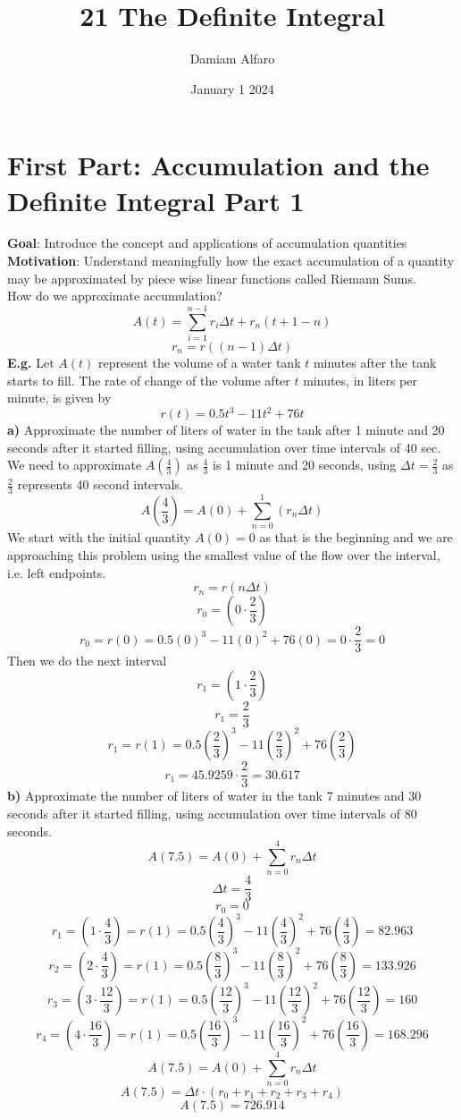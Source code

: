 \documentclass[12pt, letterpaper]{article}
\title{21 The Definite Integral}
\author{Damiam Alfaro}
\date{January 1 2024}
\begin{document}
\maketitle

\section{First Part: Accumulation and the Definite Integral Part 1}
\textbf{Goal}: Introduce the concept and applications of accumulation quantities\\
\newline
\textbf{Motivation}: Understand meaningfully how the exact accumulation of a quantity may be approximated by piece wise linear functions called Riemann Sums.\\
\newline
How do we approximate accumulation?
\[A(t)=\sum_{i=1}^{n-1}r_i\Delta t+r_n(t+1-n)\]
\[r_n = r((n-1)\Delta t)\]
\textbf{E.g.} Let \(A(t)\) represent the volume of a water tank \(t\) minutes after the tank starts to fill. The rate of change of the volume after \(t\) minutes, in liters per minute, is given by
\[r(t)=0.5t^3-11t^2+76t\]
\textbf{a)} Approximate the number of liters of water in the tank after 1 minute and 20 seconds after it started filling, using accumulation over time intervals of 40 sec.\\
We need to approximate \(A \left( \frac{4}{3} \right)\) as \(\frac{4}{3}\) is 1 minute and 20 seconds, using \(\Delta t = \frac{2}{3}\) as \(\frac{2}{3}\) represents 40 second intervals.
\[A \left( \frac{4}{3} \right) = A(0) + \sum_{n=0}^{1}(r_n\Delta t)\]
We start with the initial quantity \(A(0) = 0\) as that is the beginning and we are approaching this problem using the smallest value of the flow over the interval, i.e. left endpoints.
\[r_n = r(n\Delta t)\]
\[r_0 = \left( 0 \cdot \frac{2}{3} \right)\]
\[r_0 = r(0)=0.5(0)^3-11(0)^2+76(0)=0 \cdot \frac{2}{3}=0\]
Then we do the next interval
\[r_1 = \left(1 \cdot \frac{2}{3} \right) \]
\[r_1 = \frac{2}{3}\]
\[r_1 = r(1)=0.5\left( \frac{2}{3} \right)^3-11\left( \frac{2}{3} \right)^2+76\left( \frac{2}{3} \right)\]
\[r_1 = 45.9259 \cdot \frac{2}{3} = 30.617\]
\textbf{b)} Approximate the number of liters of water in the tank 7 minutes and 30 seconds after it started filling, using accumulation over time intervals of 80 seconds.
\[A(7.5)=A(0)+ \sum_{n=0}^{4} r_n\Delta t\]
\[\Delta t = \frac{4}{3}\]
\[r_0 = 0\]
\[r_1 = \left(1 \cdot \frac{4}{3} \right) = r(1)=0.5\left( \frac{4}{3} \right)^3-11\left( \frac{4}{3} \right)^2+76\left( \frac{4}{3} \right) = 82.963\]
\[r_2 = \left(2 \cdot \frac{4}{3} \right) = r(1)=0.5\left( \frac{8}{3} \right)^3-11\left( \frac{8}{3} \right)^2+76\left( \frac{8}{3} \right) = 133.926\]
\[r_3 = \left(3 \cdot \frac{12}{3} \right) = r(1)=0.5\left( \frac{12}{3} \right)^3-11\left( \frac{12}{3} \right)^2+76\left( \frac{12}{3} \right) = 160\]
\[r_4 = \left(4 \cdot \frac{16}{3} \right) = r(1)=0.5\left( \frac{16}{3} \right)^3-11\left( \frac{16}{3} \right)^2+76\left( \frac{16}{3} \right) = 168.296\]
\[A(7.5)=A(0)+ \sum_{n=0}^{4} r_n\Delta t\]
\[A(7.5)=\Delta t \cdot (r_0 + r_1 + r_2 + r_3 + r_4)\]
\[A(7.5)=726.914\]
\end{document}
